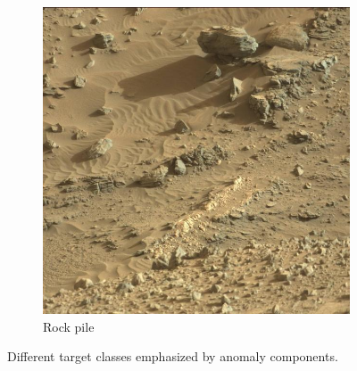 \documentclass[12pt]{article}
\begin{document}
\begin{figure}[H]
\begin{subfigure}[t]{0.49\textwidth}
    \includegraphics[width=\linewidth]{curiosity_rocks.jpg}
    \caption{Rock pile}
  \end{subfigure}
  \caption{Different target classes emphasized by anomaly components.}
  \label{fig:anomaly-boulders-rocks}
\end{figure}
\FloatBarrier
\end{document}
